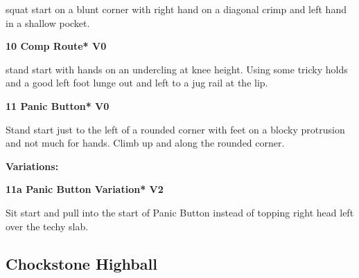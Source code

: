 \begin{multicols}{2}
\begin{minipage}{\linewidth}
					\begin{adjustwidth}{0.5cm}{}				
					squat start on a blunt corner with right hand on a diagonal crimp and left hand in a shallow pocket.
					\end{adjustwidth}
					\end{minipage}

					\begin{minipage}{\linewidth}	
					\label{rt:Comp Route}
\colorbox{green!20}{
\parbox{0.95\textwidth}{
\textbf{
10 Comp Route* V0   
}
}
}

					\begin{adjustwidth}{0.5cm}{}				
					stand start with hands on an undercling at knee height. Using some tricky holds and a good left foot lunge out and left to a jug rail at the lip.
					\end{adjustwidth}
					\end{minipage}
					\begin{minipage}{\linewidth}	
					\label{rt:Panic Button}
\colorbox{green!20}{
\parbox{0.95\textwidth}{
\textbf{
11 Panic Button* V0   
}
}
}

					\begin{adjustwidth}{0.5cm}{}				
					Stand start just to the left of a rounded corner with feet on a blocky protrusion and not much for hands. Climb up and along the rounded corner.
					\end{adjustwidth}
					\end{minipage}
						\begin{adjustwidth}{0.5cm}{}				
						\textbf{Variations:} \newline
							\begin{minipage}{\linewidth}	
							\label{vr:Panic Button Variation}
\colorbox{green!20}{
\parbox{0.95\textwidth}{
\textbf{
11a Panic Button Variation* V2    
}
}
}

							\begin{adjustwidth}{0.5cm}{}				
							Sit start and pull into the start of Panic Button instead of topping right head left over the techy slab.
							\end{adjustwidth}
							\end{minipage}
						\end{adjustwidth}
			\subsection*{Chockstone Highball}\label{bf:Chockstone Highball}
			\begin{minipage}{\columnwidth}
			\
			\end{minipage}
			

\end{multicols}
